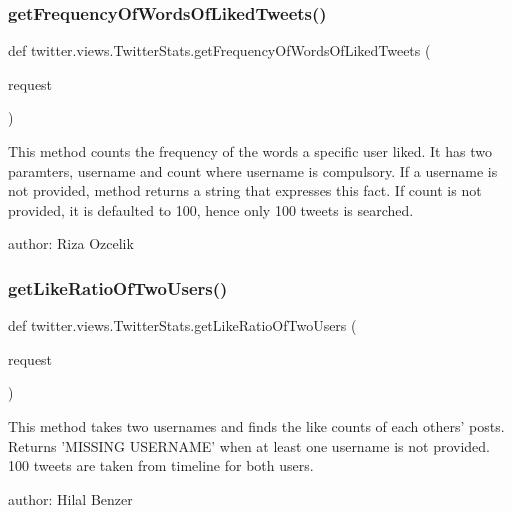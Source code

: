 \subsubsection{\texorpdfstring{get\+Frequency\+Of\+Words\+Of\+Liked\+Tweets()}{getFrequencyOfWordsOfLikedTweets()}}
{\footnotesize\ttfamily def twitter.\+views.\+Twitter\+Stats.\+get\+Frequency\+Of\+Words\+Of\+Liked\+Tweets (\begin{DoxyParamCaption}\item[{}]{request }\end{DoxyParamCaption})}

\begin{DoxyVerb}This method counts the frequency of the words a specific user liked.
It has two paramters, username and count where username is compulsory.
If a username is not provided, method returns a string that expresses this fact.
If count is not provided, it is defaulted to 100, hence only 100 tweets is searched.

author: Riza Ozcelik
\end{DoxyVerb}
 \mbox{\label{classtwitter_1_1views_1_1_twitter_stats_ae06146619068fb60465d6f99c4f9c369}} 
\subsubsection{\texorpdfstring{get\+Like\+Ratio\+Of\+Two\+Users()}{getLikeRatioOfTwoUsers()}}
{\footnotesize\ttfamily def twitter.\+views.\+Twitter\+Stats.\+get\+Like\+Ratio\+Of\+Two\+Users (\begin{DoxyParamCaption}\item[{}]{request }\end{DoxyParamCaption})}

\begin{DoxyVerb}This method takes two usernames and finds the like counts of each others' posts.
Returns 'MISSING USERNAME' when at least one username is not provided.
100 tweets are taken from timeline for both users.

author: Hilal Benzer
\end{DoxyVerb}
 \mbox{\label{classtwitter_1_1views_1_1_twitter_stats_a1b25912ecee8b0ee19af0948378a57fa}} 
